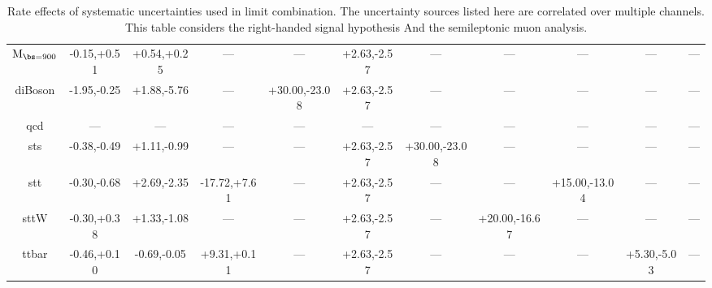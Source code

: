 \begin{table}
\begin{center}
\begin{small}
{\begin{tabular}{c||c|c|c|c|c|c|c|c|c|c}
$\mathrm{M_{\bs=900}}$ & -0.15,+0.51 & +0.54,+0.25 & --- & --- & +2.63,-2.57 & --- & --- & --- & --- & ---\\  
diBoson & -1.95,-0.25 & +1.88,-5.76 & --- & +30.00,-23.08 & +2.63,-2.57 & --- & --- & --- & --- & ---\\  
qcd & --- & --- & --- & --- & --- & --- & --- & --- & --- & ---\\  
sts & -0.38,-0.49 & +1.11,-0.99 & --- & --- & +2.63,-2.57 & +30.00,-23.08 & --- & --- & --- & ---\\  
stt & -0.30,-0.68 & +2.69,-2.35 & -17.72,+7.61 & --- & +2.63,-2.57 & --- & --- & +15.00,-13.04 & --- & ---\\  
sttW & -0.30,+0.38 & +1.33,-1.08 & --- & --- & +2.63,-2.57 & --- & +20.00,-16.67 & --- & --- & ---\\  
ttbar & -0.46,+0.10 & -0.69,-0.05 & +9.31,+0.11 & --- & +2.63,-2.57 & --- & --- & --- & +5.30,-5.03 & ---\\
\hline

\end{tabular}
}
\caption{Rate effects of systematic uncertainties used in limit combination.  The uncertainty sources listed here are correlated over multiple channels.  This table considers the right-handed signal hypothesis
And the semileptonic muon analysis.}
\label{table:bsRsysCoSm}

\end{small}
\end{center}
\end{table}




